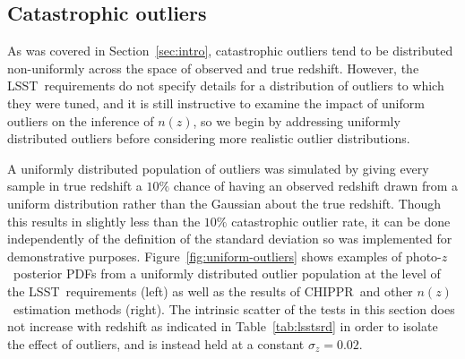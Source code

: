 \documentclass[iop]{emulateapj}
\newcommand{\Sect}[1]{Section~\ref{#1}}
\newcommand{\Fig}[1]{Figure~\ref{#1}}
\newcommand{\project}[1]{\textsc{#1}}
\newcommand{\lsst}{\project{LSST}}
\newcommand{\Chippr}{\project{CHIPPR}}%
\newcommand{\pz}{photo-$z$}
\newcommand{\pzpdf}{\pz\ posterior PDF}%
\newcommand{\nz}{$n(z)$}
\begin{document}
\subsection{Catastrophic outliers}
\label{sec:outliers}

As was covered in \Sect{sec:intro}, catastrophic outliers tend to be distributed non-uniformly across the space of observed and true redshift.
However, the \lsst\ requirements do not specify details for a distribution of outliers to which they were tuned, and it is still instructive to examine the impact of uniform outliers on the inference of \nz, so we begin by addressing uniformly distributed outliers before considering more realistic outlier distributions.

A uniformly distributed population of outliers was simulated by giving every sample in true redshift a $10\%$ chance of having an observed redshift drawn from a uniform distribution rather than the Gaussian about the true redshift.
Though this results in slightly less than the $10\%$ catastrophic outlier rate, it can be done independently of the definition of the standard deviation so was implemented for demonstrative purposes.
\Fig{fig:uniform-outliers} shows examples of \pzpdf s from a uniformly distributed outlier population at the level of the \lsst\ requirements (left) as well as the results of \Chippr\ and other \nz\ estimation methods (right).
The intrinsic scatter of the tests in this section does not increase with redshift as indicated in Table~\ref{tab:lsstsrd}
in order to isolate the effect of outliers, and is instead held at a constant $\sigma_{z} = 0.02$.
\end{document}
